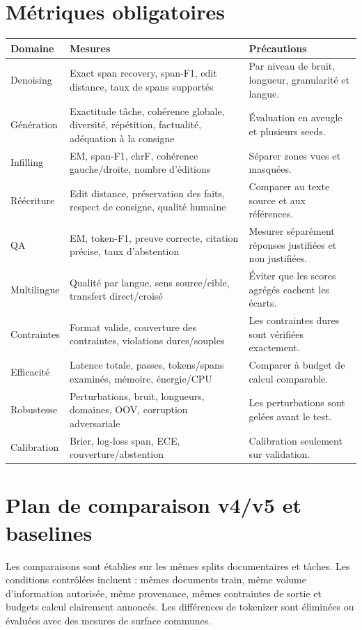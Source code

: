 \documentclass[11pt,a4paper,oneside]{report}
\begin{document}
\chapter{Métriques obligatoires}
\begin{longtable}{p{3.2cm}p{5.2cm}p{5.3cm}}
\toprule Domaine & Mesures & Précautions\\
\midrule
Denoising & Exact span recovery, span-F1, edit distance, taux de spans supportés & Par niveau de bruit, longueur, granularité et langue.\\
Génération & Exactitude tâche, cohérence globale, diversité, répétition, factualité, adéquation à la consigne & Évaluation en aveugle et plusieurs seeds.\\
Infilling & EM, span-F1, chrF, cohérence gauche/droite, nombre d'éditions & Séparer zones vues et masquées.\\
Réécriture & Edit distance, préservation des faits, respect de consigne, qualité humaine & Comparer au texte source et aux références.\\
QA & EM, token-F1, preuve correcte, citation précise, taux d'abstention & Mesurer séparément réponses justifiées et non justifiées.\\
Multilingue & Qualité par langue, sens source/cible, transfert direct/croisé & Éviter que les scores agrégés cachent les écarts.\\
Contraintes & Format valide, couverture des contraintes, violations dures/souples & Les contraintes dures sont vérifiées exactement.\\
Efficacité & Latence totale, passes, tokens/spans examinés, mémoire, énergie/CPU & Comparer à budget de calcul comparable.\\
Robustesse & Perturbations, bruit, longueurs, domaines, OOV, corruption adversariale & Les perturbations sont gelées avant le test.\\
Calibration & Brier, log-loss span, ECE, couverture/abstention & Calibration seulement sur validation.\\
\bottomrule
\end{longtable}

\chapter{Plan de comparaison v4/v5 et baselines}
Les comparaisons sont établies sur les mêmes splits documentaires et tâches. Les conditions contrôlées incluent : mêmes documents train, même volume d'information autorisée, même provenance, mêmes contraintes de sortie et budgets calcul clairement annoncés. Les différences de tokenizer sont éliminées ou évaluées avec des mesures de surface communes.
\end{document}

